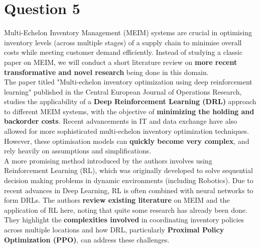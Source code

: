 \documentclass[12pt]{article}
\begin{document}
\newpage 

\section*{Question 5}


Multi-Echelon Inventory Management (MEIM) systems are crucial in optimising inventory levels (across multiple stages) of a supply chain to minimise overall costs while meeting customer demand efficiently. Instead of studying a classic paper on MEIM, we will conduct a short literature review on \textbf{more recent transformative and novel research} being done in this domain. \\

\noindent The paper titled "Multi-echelon inventory optimization using deep reinforcement learning" \cite{Geevers2023} published in the Central European Journal of Operations Research, studies the applicability of a \textbf{Deep Reinforcement Learning (DRL)} approach to different MEIM systems, with the objective of \textbf{minimizing the holding and backorder costs}. Recent advancements in IT and data exchange have also allowed for more sophisticated multi-echelon inventory optimization techniques. However, these optimisation models can \textbf{quickly become very complex}, and rely heavily on assumptions and simplifications. \\ 

\noindent A more promising method introduced by the authors involves using Reinforcement Learning (RL), which was originally developed to solve sequential decision making problems in dynamic environments (including Robotics). Due to recent advances in Deep Learning, RL is often combined with neural networks to form DRLs. The authors \textbf{review existing literature} on MEIM and the application of RL here, noting that quite some research has already been done. They highlight the \textbf{complexities involved} in coordinating inventory policies across multiple locations and how DRL, particularly \textbf{Proximal Policy Optimization (PPO)}, can address these challenges. \\ 
\end{document}
